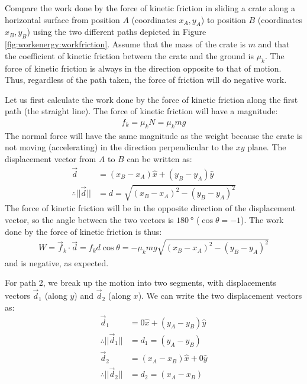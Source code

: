 \begin{example}{\label{ex:workenergy:workfriction}
Compare the work done by the force of kinetic friction in sliding a crate along a horizontal surface from position $A$ (coordinates $x_A, y_A$) to position $B$ (coordinates $x_B, y_B$) using the two different paths depicted in Figure \ref{fig:workenergy:workfriction}. Assume that the mass of the crate is $m$ and that the coefficient of kinetic friction between the crate and the ground is $\mu_k$.
}
The force of kinetic friction is always in the direction opposite to that of motion. Thus, regardless of the path taken, the force of friction will do negative work. 

Let us first calculate the work done by the force of kinetic friction along the first path (the straight line). The force of kinetic friction will have a magnitude:
\begin{align*}
f_k = \mu_k N = \mu_k mg
\end{align*}
The normal force will have the same magnitude as the weight because the crate is not moving (accelerating) in the direction perpendicular to the $xy$ plane.  The displacement vector from $A$ to $B$ can be written as:
\begin{align*}
\vec d &= (x_B-x_A)\hat x + (y_B-y_A) \hat y\\
\therefore ||\vec d|| &=d= \sqrt{(x_B-x_A)^2 - (y_B-y_A)^2}
\end{align*}  
The force of kinetic friction will be in the opposite direction of the displacement vector, so the angle between the two vectors is $\SI{180}{\degree}$ ($\cos\theta=-1$). The work done by the force of kinetic friction is thus:
\begin{align*}
W = \vec f_k \cdot\vec d = f_k d \cos\theta = -\mu_k mg\sqrt{(x_B-x_A)^2 - (y_B-y_A)^2}
\end{align*}
and is negative, as expected.

For path 2, we break up the motion into two segments, with displacements vectors $\vec d_1$ (along $y$) and $\vec d_2$ (along $x$). We can write the two displacement vectors as:
\begin{align*}
\vec d_1 &= 0\hat x + (y_A-y_B) \hat y\\
\therefore ||\vec d_1||&=d_1=(y_A-y_B)\\
\vec d_2 &= (x_A-x_B)\hat x + 0 \hat y\\
\therefore ||\vec d_2||&=d_2=(x_A-x_B)\\
\end{align*}


\end{example}
